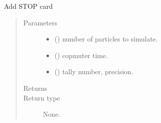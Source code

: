 \documentclass[letterpaper,10pt,english]{sphinxmanual}
\begin{document}
\begin{fulllineitems}
\begin{fulllineitems}
\label{\detokenize{api/inputgeneration:inputfile.InputFile.add_stopCard}}
\sphinxAtStartPar
Add STOP card
\begin{quote}\begin{description}
\item[{Parameters}] \leavevmode\begin{itemize}
\item {} 
\sphinxAtStartPar
{} () \textendash{} number of particles to simulate.

\item {} 
\sphinxAtStartPar
{} () \textendash{} copmuter time.

\item {} 
\sphinxAtStartPar
{} (\sphinxstyleliteralemphasis{\sphinxupquote{(}}\sphinxstyleliteralemphasis{\sphinxupquote{, }}\sphinxstyleliteralemphasis{\sphinxupquote{)}}) \textendash{} tally number, precision.

\end{itemize}

\item[{Returns}] \leavevmode
\sphinxAtStartPar


\item[{Return type}] \leavevmode
\sphinxAtStartPar
None.

\end{description}\end{quote}

\end{fulllineitems}



\end{fulllineitems}
\end{document}
